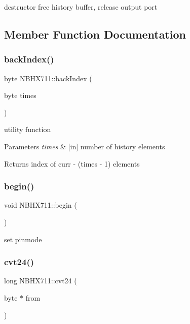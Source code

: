 destructor free history buffer, release output port 

\subsection{Member Function Documentation}
\mbox{\label{class_n_b_h_x711_ac47ea6ff71062c44ef90737a72b3bb1d}} 
\subsubsection{\texorpdfstring{back\+Index()}{backIndex()}}
{\footnotesize\ttfamily byte N\+B\+H\+X711\+::back\+Index (\begin{DoxyParamCaption}\item[{byte}]{times }\end{DoxyParamCaption})\hspace{0.3cm}{\ttfamily [protected]}}

utility function 
\begin{DoxyParams}{Parameters}
{\em times} & \mbox{[}in\mbox{]} number of history elements \\
\hline
\end{DoxyParams}
\begin{DoxyReturn}{Returns}
index of curr -\/ (times -\/ 1) elements 
\end{DoxyReturn}
\mbox{\label{class_n_b_h_x711_a447f1e82576e7f5fcf4e5f71c4edf9ce}} 
\subsubsection{\texorpdfstring{begin()}{begin()}}
{\footnotesize\ttfamily void N\+B\+H\+X711\+::begin (\begin{DoxyParamCaption}{ }\end{DoxyParamCaption})}

set pinmode \mbox{\label{class_n_b_h_x711_a260b87b30eb3061c37a11a2ec35730f8}} 
\subsubsection{\texorpdfstring{cvt24()}{cvt24()}}
{\footnotesize\ttfamily long N\+B\+H\+X711\+::cvt24 (\begin{DoxyParamCaption}\item[{byte $\ast$}]{from }\end{DoxyParamCaption})\hspace{0.3cm}{\ttfamily [protected]}}

